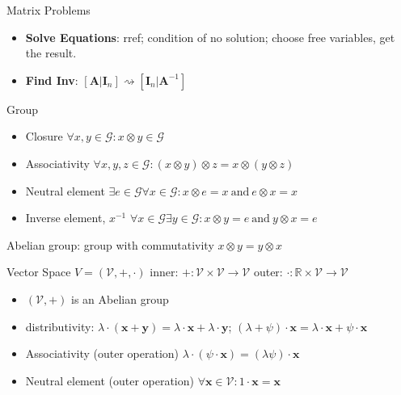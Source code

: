 \documentclass[UTF8,a4paper]{article}
\begin{document}
\begin{cheatsheetblock}{Matrix Problems}
    \begin{itemize}
        \item \textbf{Solve Equations}: rref; condition of no solution; choose free variables, get the result.
        \item \textbf{Find Inv}: $ [\bm{A} | \bm{I}_{n}] \rightsquigarrow [\bm{I}_{n} | \bm{A}^{-1}]$
    \end{itemize}
\end{cheatsheetblock}

\begin{cheatsheetblock}{Group}
    \begin{itemize}
        \item Closure \hfill$\forall x,y\in\mathcal{G}:x\otimes y\in\mathcal{G}$
        \item Associativity \hfill $\forall x,y,z\in\mathcal{G}:(x\otimes y)\otimes z=x\otimes(y\otimes z)$
        \item Neutral element \hfill $\exists e\in\mathcal{G}\forall x\in\mathcal{G}:x\otimes e=x\mathrm{~and~}e\otimes x=x$
        \item Inverse element, $x^{-1}$ \hfill $\forall x\in\mathcal{G}\exists y\in\mathcal{G}:x\otimes y=e\mathrm{~and~}y\otimes x=e$
    \end{itemize}
    Abelian group: group with commutativity \hfill $x\otimes y=y\otimes x$
\end{cheatsheetblock}

\begin{cheatsheetblock}{Vector Space}
    $V=(\mathcal{V},+,\cdot)$ \hfill inner: $+:\mathcal{V}\times\mathcal{V}\to\mathcal{V}$ \hfill outer: $\cdot:\mathbb{R}\times\mathcal{V}\to\mathcal{V}$
    \begin{itemize}
        \item $(\mathcal{V},+)$ is an Abelian group
        \item distributivity: $\lambda\cdot(\boldsymbol{x}+\boldsymbol{y})=\lambda\cdot\boldsymbol{x}+\lambda\cdot\boldsymbol{y}$; $(\lambda+\psi)\cdot\boldsymbol{x}=\lambda\cdot\boldsymbol{x}+\psi\cdot\boldsymbol{x}$
        \item Associativity (outer operation) \hfill $\lambda\cdot(\psi\cdot\boldsymbol{x})=(\lambda\psi)\cdot\boldsymbol{x}$
        \item Neutral element (outer operation) \hfill $\forall\boldsymbol{x}\in\mathcal{V}:1\cdot\boldsymbol{x}=\boldsymbol{x}$
    \end{itemize}
\end{cheatsheetblock}
\end{document}
